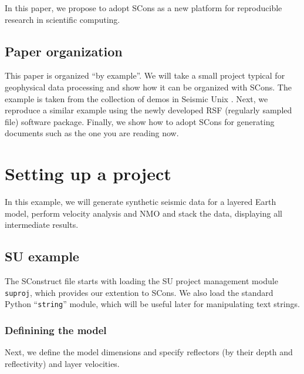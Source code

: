 In this paper, we propose to adopt SCons as a new platform for reproducible
research in scientific computing.

\subsection{Paper organization}

This paper is organized ``by example''. We will take a small project typical
for geophysical data processing and show how it can be organized with SCons.
The example is taken from the collection of demos in Seismic Unix \cite[]{su}.
Next, we reproduce a similar example using the newly developed RSF (regularly
sampled file) software package. Finally, we show how to adopt SCons for
generating documents such as the one you are reading now.

\section{Setting up a project}

In this example, we will generate synthetic seismic data for a layered
Earth model, perform velocity analysis and NMO and stack the data,
displaying all intermediate results.


\subsection{SU example}

The SConstruct file starts with loading the SU project management
module \texttt{suproj}, which provides our extention to SCons. We also
load the standard Python ``\texttt{string}'' module, which will be
useful later for manipulating text strings.



\subsubsection{Definining the model}

Next, we define the model dimensions and specify reflectors (by their
depth and reflectivity) and layer velocities.




